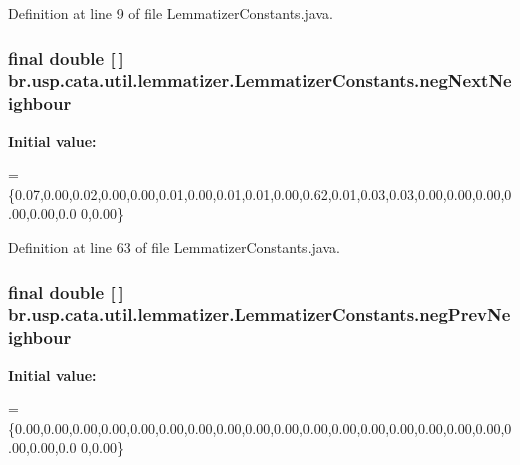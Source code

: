 Definition at line 9 of file Lemmatizer\+Constants.\+java.

\hypertarget{classbr_1_1usp_1_1cata_1_1util_1_1lemmatizer_1_1_lemmatizer_constants_a38580d128a832b170865f075403a9695}{
\subsubsection[{neg\+Next\+Neighbour}]{\setlength{\rightskip}{0pt plus 5cm}final double \mbox{[}$\,$\mbox{]} br.\+usp.\+cata.\+util.\+lemmatizer.\+Lemmatizer\+Constants.\+neg\+Next\+Neighbour\hspace{0.3cm}{\ttfamily [static]}}}\label{classbr_1_1usp_1_1cata_1_1util_1_1lemmatizer_1_1_lemmatizer_constants_a38580d128a832b170865f075403a9695}
{\bfseries Initial value\+:}
\begin{DoxyCode}
=
        \{0.07,0.00,0.02,0.00,0.00,0.01,0.00,0.01,0.01,0.00,0.62,0.01,0.03,0.03,0.00,0.00,0.00,0.00,0.00,0.0
      0,0.00\}
\end{DoxyCode}


Definition at line 63 of file Lemmatizer\+Constants.\+java.

\hypertarget{classbr_1_1usp_1_1cata_1_1util_1_1lemmatizer_1_1_lemmatizer_constants_a00b3a125b1ad2de04062bbba0c83a093}{
\subsubsection[{neg\+Prev\+Neighbour}]{\setlength{\rightskip}{0pt plus 5cm}final double \mbox{[}$\,$\mbox{]} br.\+usp.\+cata.\+util.\+lemmatizer.\+Lemmatizer\+Constants.\+neg\+Prev\+Neighbour\hspace{0.3cm}{\ttfamily [static]}}}\label{classbr_1_1usp_1_1cata_1_1util_1_1lemmatizer_1_1_lemmatizer_constants_a00b3a125b1ad2de04062bbba0c83a093}
{\bfseries Initial value\+:}
\begin{DoxyCode}
=
        \{0.00,0.00,0.00,0.00,0.00,0.00,0.00,0.00,0.00,0.00,0.00,0.00,0.00,0.00,0.00,0.00,0.00,0.00,0.00,0.0
      0,0.00\}
\end{DoxyCode}



